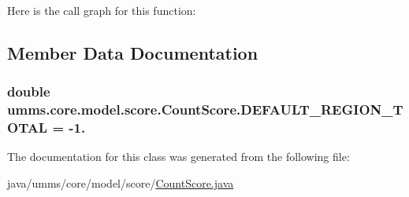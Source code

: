 Here is the call graph for this function\+:




\subsection{Member Data Documentation}
\hypertarget{classumms_1_1core_1_1model_1_1score_1_1_count_score_a55eccfb809c04f74d0d68551d2614b3a}{
\subsubsection[{D\+E\+F\+A\+U\+L\+T\+\_\+\+R\+E\+G\+I\+O\+N\+\_\+\+T\+O\+T\+A\+L}]{\setlength{\rightskip}{0pt plus 5cm}double umms.\+core.\+model.\+score.\+Count\+Score.\+D\+E\+F\+A\+U\+L\+T\+\_\+\+R\+E\+G\+I\+O\+N\+\_\+\+T\+O\+T\+A\+L = -\/1.\hspace{0.3cm}{\ttfamily [static]}}}\label{classumms_1_1core_1_1model_1_1score_1_1_count_score_a55eccfb809c04f74d0d68551d2614b3a}


The documentation for this class was generated from the following file\+:\begin{DoxyCompactItemize}
\item 
java/umms/core/model/score/\hyperlink{_count_score_8java}{Count\+Score.\+java}\end{DoxyCompactItemize}

